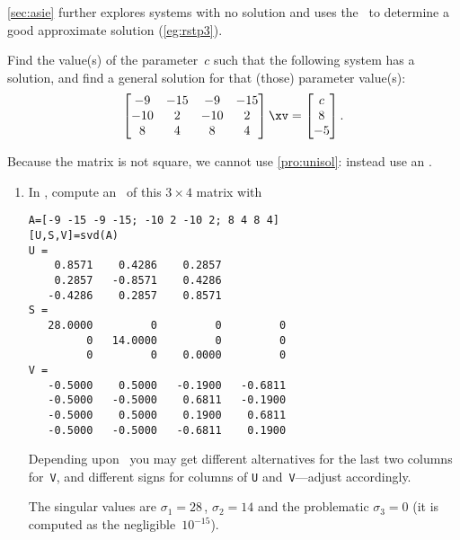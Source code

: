 \autoref{sec:asie} further explores systems with no solution and uses the \svd\ to determine a good approximate solution (\autoref{eg:rstp3}).



\begin{example} \label{eg:3x4findc}
Find the value(s) of the parameter~\(c\) such that the following system has a solution, and find a general solution for that (those) parameter value(s):
\begin{equation*}
\begin{bmatrix} -9&-15&-9&-15
\\-10&2&-10&2
\\8&4&8&4 \end{bmatrix}\xv=
\begin{bmatrix} c\\8\\-5 \end{bmatrix}.
\end{equation*}
\begin{solution} 
Because the matrix is not square, we cannot use \autoref{pro:unisol}: instead use an \svd.
\begin{enumerate}
\item In \script, compute an \svd\  of this \(3\times 4\) matrix with 
\setbox\ajrqrbox\hbox{}%
\marginpar{\usebox{\ajrqrbox\\[2ex]}}%
\begin{verbatim}
A=[-9 -15 -9 -15; -10 2 -10 2; 8 4 8 4]
[U,S,V]=svd(A)
U =
    0.8571    0.4286    0.2857
    0.2857   -0.8571    0.4286
   -0.4286    0.2857    0.8571
S =
   28.0000         0         0         0
         0   14.0000         0         0
         0         0    0.0000         0
V =
   -0.5000    0.5000   -0.1900   -0.6811
   -0.5000   -0.5000    0.6811   -0.1900
   -0.5000    0.5000    0.1900    0.6811
   -0.5000   -0.5000   -0.6811    0.1900
\end{verbatim}
\begin{aside}
Depending upon \script\ you may get different alternatives for the last two columns for~\texttt{V}, and different signs for columns of \texttt{U} and~\texttt{V}---adjust accordingly.
\end{aside}%
The singular values are \(\sigma_1=28\)\,, \(\sigma_2=14\) and the problematic \(\sigma_3=0\) (it is computed as the negligible~\(10^{-15}\)).


\end{enumerate}
\end{solution}
\end{example}
